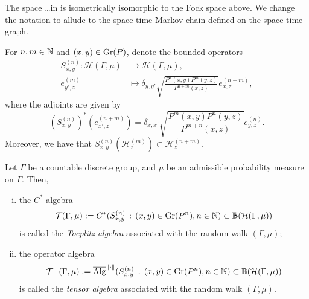 \documentclass[12pt, class = article, crop = false, a4paper, twoside]{standalone}
\begin{document}
\begin{remark}

    The space \dots in \cite{DOMA17} is isometrically isomorphic to the Fock space above. We change the notation to allude to the space-time Markov chain defined on the space-time graph.
\end{remark}

\begin{notation}

    For $n, m\in\mathbb{N}$ and $(x, y)\in\operatorname{Gr}(P)$, denote the bounded operators
    \begin{equation*}
        \begin{split}
            S^{(n)}_{x, y}\colon \mathcal{H}(\Gamma, \mu) & \to\mathcal{H}(\Gamma, \mu), \\
            e^{(m)}_{y', z} & \mapsto\delta_{y, y'}\sqrt{\frac{P^{n}(x, y)P^{m}(y, z)}{P^{n + m}(x, z)}}e^{(n + m)}_{x, z},
        \end{split}
    \end{equation*}
    where the adjoints are given by
    \begin{equation*}
        (S^{(n)}_{x, y})^{\ast}(e^{(n + m)}_{x', z}) = \delta_{x, x'}\sqrt{\frac{P^{m}(x, y)P^{n}(y, z)}{P^{m + n}(x, z)}}e^{(n)}_{y, z}.
    \end{equation*}
    Moreover, we have that $S^{(n)}_{x, y}(\mathcal{H}^{(m)}_{z})\subset \mathcal{H}^{(n + m)}_{z}$.
\end{notation}

\begin{definition}

    Let $\Gamma$ be a countable discrete group, and $\mu$ be an admissible probability measure on $\Gamma$. Then, 
    \begin{enumerate}[(i)]
        \item the $C^{\ast}$-algebra
            \begin{equation}
                \mathcal{T}(\Gamma, \mu) := C^{*}(S^{(n)}_{x, y} \,:\, (x, y)\in\operatorname{Gr}(P^{n}), n\in\mathbb{N}) \subset \mathbb{B}(\mathcal{H}(\Gamma, \mu))
            \end{equation}
            is called the \textit{Toeplitz algebra} associated with the random walk $(\Gamma, \mu)$;
        \item the operator algebra
            \begin{equation}
                \mathcal{T}^{+}(\Gamma, \mu) := \overline{\operatorname{Alg}}^{\|\cdot\|}(S^{(n)}_{x, y} \,:\, (x, y)\in\operatorname{Gr}(P^{n}), n\in\mathbb{N}) \subset \mathbb{B}(\mathcal{H}(\Gamma, \mu))
            \end{equation}
            is called the \textit{tensor algebra} associated with the random walk $(\Gamma, \mu)$.
    \end{enumerate}
\end{definition}
\end{document}
